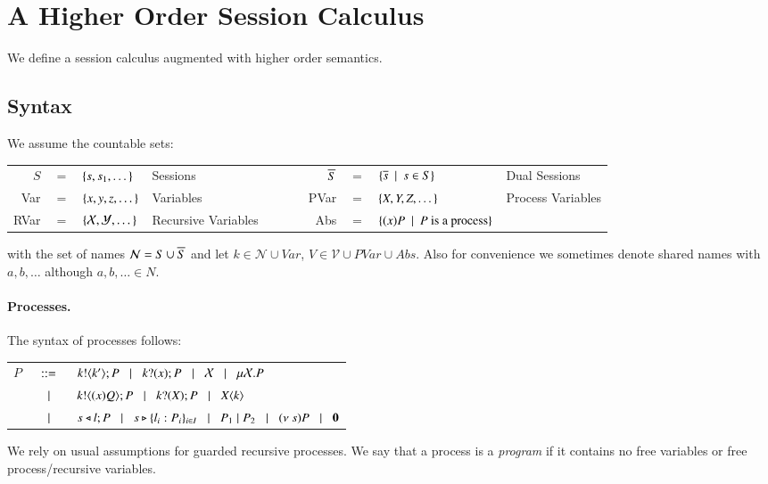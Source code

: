 \section{A Higher Order Session Calculus}

We define a session calculus augmented with higher order semantics.

\subsection{Syntax}

We assume the countable sets:

\begin{tabular}{rcllcrcll}
	$S$ &$=$& $\{s, s_1, \dots\}$ & Sessions
	&$\qquad$&
	$\overline{S}$ &$=$& $\{\overline{s} \ \ |\ \  s \in S\}$ & Dual Sessions
	\\

	Var &$=$& $\{x,y,z, \dots\}$ & Variables
	&$\qquad$&
	PVar &$=$& $\{X, Y, Z, \dots\}$ & Process Variables\\

	RVar &$=$& $\{\mathcal{X}, \mathcal{Y}, \dots\}$ & Recursive Variables
	&$\qquad$&
	Abs &$=$& $\{(x)P \ \ |\ \  P \textrm{ is a process}\}$
\end{tabular}

with the set of names $\mathcal{N} = S \cup \overline{S}$ and let $k \in \mathcal{N} \cup Var$,
$V \in \mathcal{V} \cup PVar \cup Abs$.
Also for convenience we sometimes denote shared names with $a, b, \dots$ although $a,b,\dots \in N$.

\paragraph{Processes.}

The syntax of processes follows:

\begin{tabular}{rcl}
	$P$	&$\;\;::=\;\;$&	$k ! \langle k' \rangle ; P \;\;\;|\;\;\; k ? (x) ; P \;\;\;|\;\;\; \mathcal{X} \;\;\;|\;\;\; \mu \mathcal{X}. P$\\
		&$\;\;\;|\;\;\;$&	$k ! \langle (x)Q \rangle ; P \;\;\;|\;\;\; k ? (X) ; P \;\;\;|\;\;\; X\langle k \rangle$\\ 
		&$\;\;\;|\;\;\;$&	$s \triangleleft l ; P \;\;\;|\;\;\; s \triangleright \{l_i:P_i\}_{i \in I} \;\;\;|\;\;\; 
				P_1 \;|\; P_2 \;\;\;|\;\;\; (\nu\ s) P \;\;\;|\;\;\; \mathbf{0}$
\end{tabular}

We rely on usual assumptions for guarded recursive processes.
We say that a process is a \emph{program} if it contains
no free variables or free process/recursive variables.

